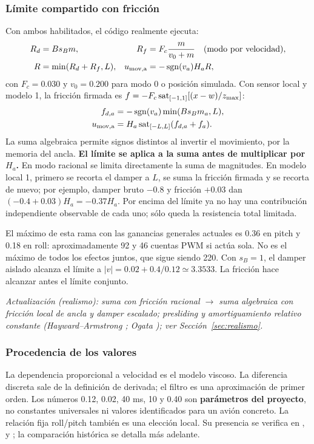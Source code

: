\subsubsection{Límite compartido con fricción}
Con ambos habilitados, el código realmente ejecuta:
\begin{align}
R_d&=Bs_Bm, & R_f&=F_c\frac{m}{v_0+m}\quad\text{(modo por velocidad)},\\
R&=\min(R_d+R_f,L), &
u_{\rm mov,a}&=-\operatorname{sgn}(v_a)H_aR,
\label{eq:movimiento_conjunto}
\end{align}
con $F_c=0.030$ y $v_0=0.200$ para modo 0 o posición simulada. Con sensor local y modelo 1, la fricción firmada es $f=-F_c\operatorname{sat}_{[-1,1]}[(x-w)/z_{\max}]$:
\begin{align}
f_{d,a}&=-\operatorname{sgn}(v_a)\min(Bs_Bm_a,L),\\
u_{\rm mov,a}&=H_a%
\sat_{[-L,L]}(f_{d,a}+f_a).
\end{align}
La suma algebraica permite signos distintos al invertir el movimiento, por la memoria del ancla. \textbf{El límite se aplica a la suma antes de multiplicar por $H_a$.} En modo racional se limita directamente la suma de magnitudes. En modelo local 1, primero se recorta el damper a $L$, se suma la fricción firmada y se recorta de nuevo; por ejemplo, damper bruto $-0.8$ y fricción $+0.03$ dan $(-0.4+0.03)H_a=-0.37H_a$. Por encima del límite ya no hay una contribución independiente observable de cada uno; sólo queda la resistencia total limitada.

El máximo de esta rama con las ganancias generales actuales es 0.36 en pitch y 0.18 en roll: aproximadamente 92 y 46 cuentas PWM si actúa sola. No es el máximo de todos los efectos juntos, que sigue siendo 220. Con $s_B=1$, el damper aislado alcanza el límite a $|v|=0.02+0.4/0.12\simeq3.3533$. La fricción hace alcanzar antes el límite conjunto.

\textit{Actualización (realismo): suma con fricción racional $\rightarrow$ suma algebraica con fricción local de ancla y damper escalado; presliding y amortiguamiento relativo constante (Hayward--Armstrong \cite{hayward2000}; Ogata \cite{ogata}); ver Sección~\ref{sec:realismo}.}

\subsubsection{Procedencia de los valores}
La dependencia proporcional a velocidad es el modelo viscoso. La diferencia discreta sale de la definición de derivada; el filtro es una aproximación de primer orden. Los números 0.12, 0.02, 40 ms, 10 y 0.40 son \textbf{parámetros del proyecto}, no constantes universales ni valores identificados para un avión concreto. La relación fija roll/pitch también es una elección local. Su presencia se verifica en ,  y ; la comparación histórica se detalla más adelante.


